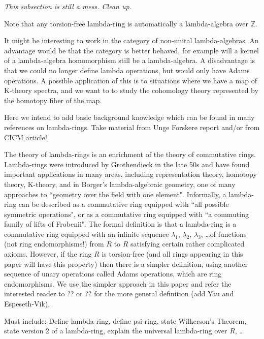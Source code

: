 \emph{This subsection is still a mess. Clean up.}

\begin{remark}
Note that any torsion-free lambda-ring is automatically a lambda-algebra over $\mathbb{Z}$.
\end{remark}

\begin{remark}
It might be interesting to work in the category of non-unital lambda-algebras. An advantage would be that the category is better behaved, for example will a kernel of a lambda-algebra homomorphism still be a lambda-algebra. A disadvantage is that we could no longer define lambda operations, but would only have Adams operations. A possible application of this is to situations where we have a map of K-theory spectra, and we want to to study the cohomology theory represented by the homotopy fiber of the map.
\end{remark}

Here we intend to add basic background knowledge which can be found in many references on lambda-rings. Take material from Unge Forskere report and/or from CICM article!

The theory of lambda-rings is an enrichment of the theory of commutative rings. Lambda-rings were introduced by Grothendieck in the late 50s and have found important applications in many areas, including representation theory, homotopy theory, K-theory, and in Borger's lambda-algebraic geometry, one of many approaches to ``geometry over the field with one element". Informally, a lambda-ring can be described as a commutative ring equipped with ``all possible symmetric operations", or as a commutative ring equipped with ``a commuting family of lifts of Frobenii". The formal definition is that a lambda-ring is a commutative ring equipped with an infinite sequence $\lambda_1$, $\lambda_2$, $\lambda_3$, \ldots of functions (not ring endomorphisms!) from $R$ to $R$ satisfying certain rather complicated axioms. However, if the ring $R$ is torsion-free (and all rings appearing in this paper will have this property) then there is a simpler definition, using another sequence of unary operations called Adams operations, which are ring endomorphisms. We use the simpler approach in this paper and refer the interested reader to ?? or ?? for the more general definition (add Yau and Espeseth-Vik). 



Must include: Define lambda-ring, define psi-ring, state Wilkerson's Theorem, state version 2 of a lambda-ring, explain the universal lambda-ring over $R$, \ldots

